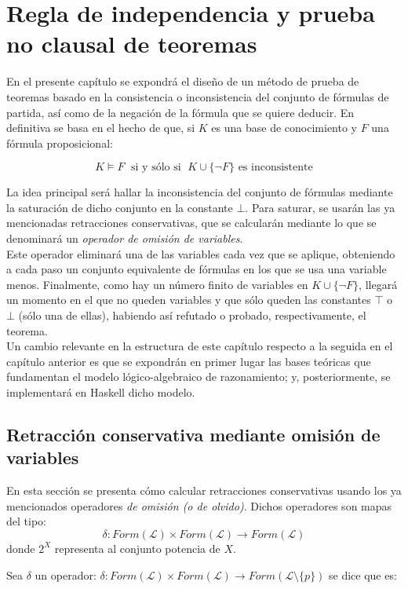 \chapter{Regla de independencia y prueba no clausal de teoremas}

En el presente capítulo se expondrá el diseño de un método de prueba de teoremas basado en la consistencia o inconsistencia del conjunto de fórmulas de partida, así como de la negación de la fórmula que se quiere deducir. En definitiva se basa en el hecho de que, si $K$ es una base de conocimiento y $F$ una fórmula proposicional:

$$K\vDash F \;\text{ si y sólo si }\; K \cup \{ \neg F \} \text{ es inconsistente}$$

La idea principal será hallar la inconsistencia del conjunto de fórmulas mediante la saturación de dicho conjunto en la constante $\bot$. Para saturar, se usarán las ya mencionadas retracciones conservativas,  que se calcularán mediante lo que se denominará un \textit{operador de omisión de variables}. \\

Este operador eliminará una de las variables cada vez que se aplique, obteniendo a cada paso un conjunto equivalente de fórmulas en los que se usa una variable menos. Finalmente, como hay un número finito de variables en $K \cup \{ \neg F \} $, llegará un momento en el que no queden variables y que sólo queden las constantes $\top$ o $\bot$ (sólo una de ellas), habiendo así refutado o probado, respectivamente, el teorema.\\

Un cambio relevante en la estructura de este capítulo respecto a la seguida en el capítulo anterior es que se expondrán en primer lugar las bases teóricas que fundamentan el modelo lógico-algebraico de razonamiento; y, posteriormente, se implementará en Haskell dicho modelo. 

\section{Retracción conservativa mediante omisión de variables}
En esta sección se presenta cómo calcular retracciones conservativas usando los ya mencionados operadores \textit{de omisión (o de olvido)}. Dichos operadores son mapas del tipo:
$$\delta : Form(\mathcal{L}) \times Form(\mathcal{L}) \longrightarrow Form(\mathcal{L}) $$
donde $2^X$ representa al conjunto potencia de $X$. 

 Sea $\delta$ un operador: $\delta :Form(\mathcal{L}) \times Form(\mathcal{L}) \longrightarrow Form(\mathcal{L} \setminus \{ p \})$  se dice que es:

